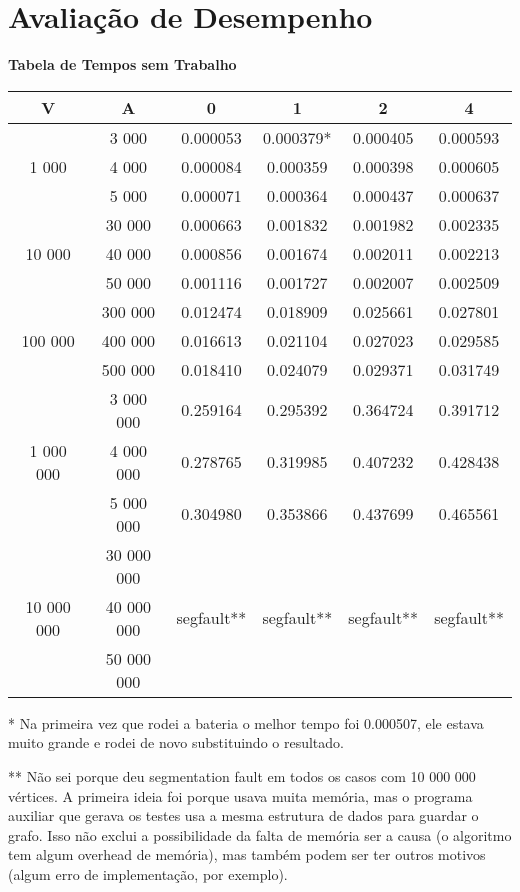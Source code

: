 \documentclass[12pt]{article}
\newcommand{\tb}{\textbf}
\begin{document}
\newpage
\section{Avaliação de Desempenho}

\begin{center}
	\tb{Tabela de Tempos sem Trabalho}
\begin{tabular}{|c|c||c|c|c|c|}
	\hline
	V & A & 0 & 1 & 2 & 4 \\
	\hline
	      & 3 000 & 0.000053 & 0.000379* & 0.000405 & 0.000593 \\
	1 000 & 4 000 & 0.000084 & 0.000359 & 0.000398 & 0.000605 \\
	      & 5 000 & 0.000071 & 0.000364 & 0.000437 & 0.000637 \\
	\hline
	       & 30 000 & 0.000663 & 0.001832 & 0.001982 & 0.002335 \\
	10 000 & 40 000 & 0.000856 & 0.001674 & 0.002011 & 0.002213 \\
	       & 50 000 & 0.001116 & 0.001727 & 0.002007 & 0.002509 \\
	\hline
	        & 300 000 & 0.012474 & 0.018909 & 0.025661 & 0.027801 \\
	100 000 & 400 000 & 0.016613 & 0.021104 & 0.027023 & 0.029585 \\
	        & 500 000 & 0.018410 & 0.024079 & 0.029371 & 0.031749 \\
	\hline
	          & 3 000 000 & 0.259164 & 0.295392 & 0.364724 & 0.391712 \\
	1 000 000 & 4 000 000 & 0.278765 & 0.319985 & 0.407232 & 0.428438 \\
	          & 5 000 000 & 0.304980 & 0.353866 & 0.437699 & 0.465561 \\
	\hline
	           & 30 000 000 &          &          &          &          \\
	10 000 000 & 40 000 000 & segfault** & segfault** & segfault** & segfault** \\
	           & 50 000 000 &          &          &          &          \\
	\hline
\end{tabular}\end{center}

* Na primeira vez que rodei a bateria o melhor tempo foi 0.000507,
ele estava muito grande e rodei de novo substituindo o resultado.

** Não sei porque deu segmentation fault em todos os casos com
10 000 000 vértices.
A primeira ideia foi porque usava muita memória,
mas o programa auxiliar que gerava os testes
usa a mesma estrutura de dados para guardar o grafo.
Isso não exclui a possibilidade da falta de memória ser a causa
(o algoritmo tem algum overhead de memória),
mas também podem ser ter outros motivos
(algum erro de implementação, por exemplo).
\end{document}
